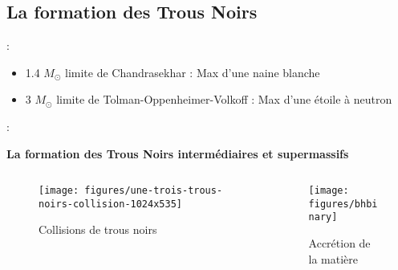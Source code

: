 {

\subsection{La formation des Trous Noirs}
\begin{frame}{\underline{\secname} : {\small \subsecname}}





\begin{itemize}
		 \setlength\itemsep{0em}
\item 1.4 \(M_\odot\)  limite de Chandrasekhar : Max d’une naine blanche

\item 3 \(M_\odot\) limite de Tolman-Oppenheimer-Volkoff : Max d’une étoile à neutron
\end{itemize}




\end{frame}

}

\begin{frame}{\underline{\secname} : {\small \subsecname}}

\begin{center}
	\textbf{La formation des Trous Noirs intermédiaires et supermassifs}
\end{center}
 \begin{columns}
	
	\begin{column}{0.5\linewidth}
				      \begin{figure}
			\texttt{[image: figures/une-trois-trous-noirs-collision-1024x535]}
			\caption{Collisions de trous noirs}
			
			
		\end{figure}
	\end{column}
	\begin{column}{0.5\linewidth}
		      \begin{figure}
	\texttt{[image: figures/bhbinary]}
	\caption{Accrétion de la matière}
	
	
\end{figure}
	\end{column}
\end{columns}
\end{frame}

